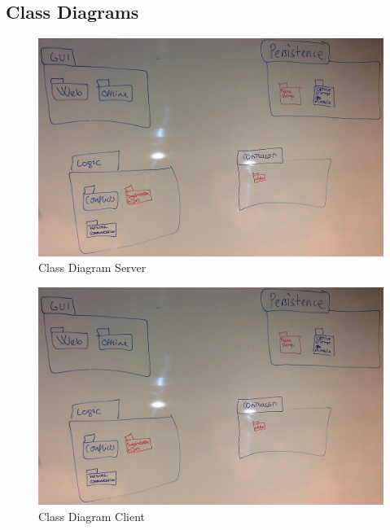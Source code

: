 \subsection{Class Diagrams}
\label{classdiagrams}
\begin{figure}[H]
  \includegraphics[width=\textwidth]{illustrations/PackageDiagram.jpg}
  \caption{Class Diagram Server}
  \label{classdiagramserver}
\end{figure}
\begin{figure}[H]
  \includegraphics[width=\textwidth]{illustrations/PackageDiagram.jpg}
  \caption{Class Diagram Client}
  \label{classdiagramclient}
\end{figure}
